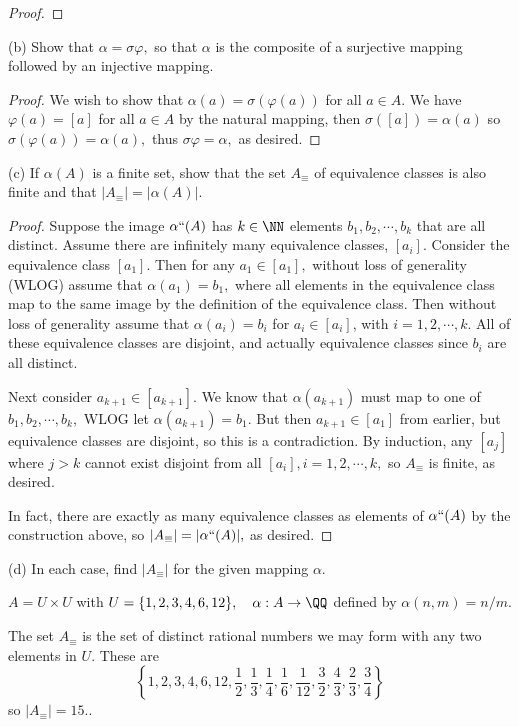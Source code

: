 \documentclass{article}
\begin{document}
\begin{itemize}
\begin{proof}
		\end{proof}

		(b) Show that $\alpha=\sigma\varphi,$ so that $\alpha$ is the composite of a surjective mapping followed by an injective mapping.
			\begin{proof}
				We wish to show that $\alpha(a)=\sigma(\varphi(a))$ for all $a\in A.$ We have $\varphi(a)=[a]$ for all $a\in A$ by the natural mapping, then $\sigma([a])=\alpha(a)$ so $\sigma(\varphi(a))=\alpha(a),$ thus $\sigma\varphi=\alpha,$ as desired.
				
			\end{proof}

		(c) If $\alpha(A)$ is a finite set, show that the set $A_{\equiv}$ of equivalence classes is also finite and that $\vert A_{\equiv}\vert=\vert\alpha(A)\vert.$
			\begin{proof}
				Suppose the image $\alpha``(A)$ has $k\in\NN$ elements $b_1, b_2, \cdots, b_k$ that are all distinct. Assume there are infinitely many equivalence classes, $[a_i].$ Consider the equivalence class $[a_1].$ Then for any $a_1\in[a_1],$ without loss of generality (WLOG) assume that $\alpha(a_1)=b_1,$ where all elements in the equivalence class map to the same image by the definition of the equivalence class. Then without loss of generality assume that $\alpha(a_i)=b_i$ for $a_i\in[a_i]$, with $i=1, 2, \cdots, k.$ All of these equivalence classes are disjoint, and actually equivalence classes since $b_i$ are all distinct.
				
				Next consider $a_{k+1}\in[a_{k+1}].$ We know that $\alpha(a_{k+1})$ must map to one of $b_1, b_2, \cdots, b_k,$ WLOG let $\alpha(a_{k+1})=b_1.$ But then $a_{k+1}\in[a_1]$ from earlier, but equivalence classes are disjoint, so this is a contradiction. By induction, any $[a_j]$ where $j>k$ cannot exist disjoint from all $[a_i], i=1, 2, \cdots, k,$ so $A_{\equiv}$ is finite, as desired. 
				
				In fact, there are exactly as many equivalence classes as elements of $\alpha``(A)$ by the construction above, so $\vert A_\equiv\vert=\vert\alpha``(A)\vert,$ as desired.
			
			\end{proof}

		(d) In each case, find $\vert A_{\equiv}\vert$ for the given mapping $\alpha.$

		\begin{enumerate}[(i)]
				\ii $A=U\times U$ with $U=\{1, 2, 3, 4, 6, 12\}, \quad \alpha:A\to\QQ$ defined by $\alpha(n, m)=n/m.$
					\begin{soln}
						The set $A_{\equiv}$ is the set of distinct rational numbers we may form with any two elements in $U.$ These are \[\left\{1, 2, 3, 4, 6, 12, \frac{1}{2}, \frac{1}{3}, \frac{1}{4}, \frac{1}{6}, \frac{1}{12}, \frac{3}{2}, \frac{4}{3}, \frac{2}{3}, \frac{3}{4}\right\}\] so $\vert A_{\equiv}\vert=\boxed{15.}.$


\end{soln}
\end{enumerate}
\end{itemize}
\end{document}
